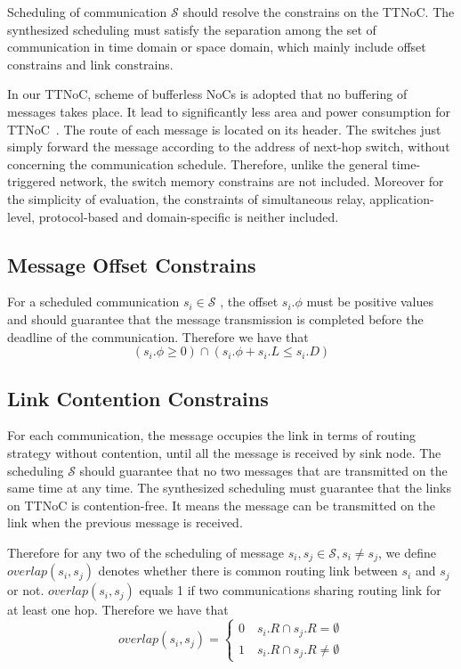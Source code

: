 \documentclass[journal]{IEEEtran}
\newcommand{\calS}{\mathcal{S}}
\begin{document}
Scheduling of communication $\calS$ should resolve the constrains on the TTNoC. 
The synthesized scheduling must satisfy the separation among the set of communication in time domain or space domain, which mainly include offset constrains and link constrains.

In our TTNoC, scheme of bufferless NoCs is adopted that no buffering of messages takes place. 
It lead to significantly less area and power consumption for TTNoC~\cite{DBLP:journals/tpds/ShpinerKLCK15}.
The route of each message is located on its header.
The switches just simply forward the message according to the address of next-hop switch, without concerning the communication schedule. Therefore, unlike the general time-triggered network, the switch memory constrains are not included.
Moreover for the simplicity of evaluation, the constraints of simultaneous relay, application-level, protocol-based and domain-specific is neither included.

\subsection{Message Offset Constrains}

For a scheduled communication $s_{i}\in\calS$ , the offset $s_i.\phi$  must be positive values and should guarantee that the message transmission is completed before the deadline of the communication. Therefore we have that
\begin{equation}
	(s_i.\phi
	\geq 0)
	\cap
	(s_i.\phi + s_i.L
	\leq
	s_i.D)
\end{equation}

\subsection{Link Contention Constrains}

For each communication, the message occupies the link in terms of routing strategy without contention, 
until all the message is received by sink node. The scheduling $\calS$ should guarantee that no two messages that are transmitted on the same time at any time. 
The synthesized scheduling must guarantee that the links on TTNoC is contention-free.
It means the message can be transmitted on the link when the previous message is received.

Therefore for any two of the scheduling of message 
$s_i,s_j\in\calS,s_i\neq s_j$,
we define 
$ overlap(s_i,s_j)$
 denotes whether there is common routing link between $s_i$ and $s_j$ or not. 
$ overlap(s_i,s_j)$ equals 1 if two communications sharing routing link for at least one hop. 
Therefore we have that
\begin{equation}
overlap(s_i,s_j)= 
	\begin{cases}
	0 \quad s_i.R \cap s_j.R = \emptyset\\
	1 \quad s_i.R \cap s_j.R \neq \emptyset
\end{cases}
\end{equation}
\end{document}
